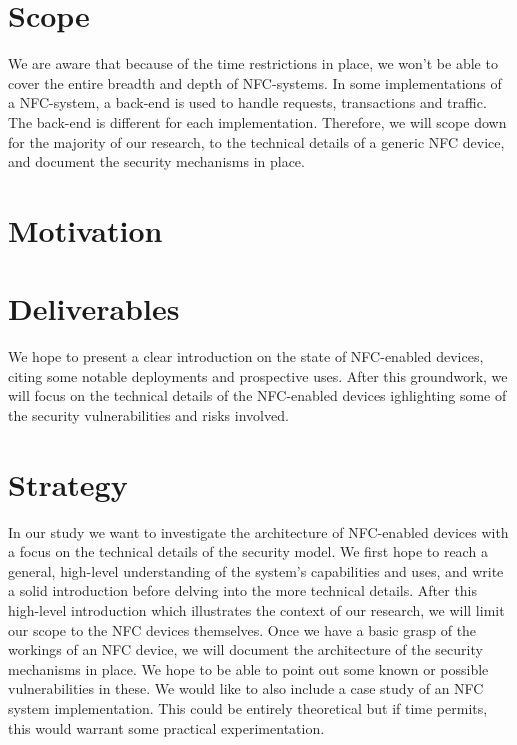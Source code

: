\documentclass[11pt]{article} %
\begin{document}
\section{Scope}
We are aware that because of the time restrictions in place, we won't be able to cover the entire breadth and depth of NFC-systems. In some implementations of a NFC-system, a back-end is used to handle requests, transactions and traffic. The back-end is different for each implementation. Therefore, we will scope down for the majority of our research, to the technical details of a generic NFC device, and document the security mechanisms in place. 

\section{Motivation}

\section{Deliverables}
We hope to present a clear introduction on the state of NFC-enabled devices, citing some notable deployments and prospective uses.
After this groundwork, we will focus on the technical details of the NFC-enabled devices ighlighting some of the security vulnerabilities and risks involved.

\section{Strategy}
In our study we want to investigate the architecture of NFC-enabled devices with a focus on the technical details of the security model. We first hope to reach a general, high-level understanding of the system's capabilities and uses, and write a solid introduction before delving into the more technical details. After this high-level introduction which illustrates the context of our research, we will limit our scope to the NFC devices themselves.
Once we have a basic grasp of the workings of an NFC device, we will document the architecture of the security mechanisms in place. We hope to be able to point out some known or possible vulnerabilities in these.
We would like to also include a case study of an NFC system implementation. This could be entirely theoretical but if time permits, this would warrant some practical experimentation.
\end{document}
